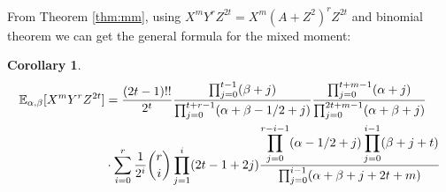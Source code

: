 \documentclass{elsarticle}
\def\E{\mathbb{E}}
\newtheorem{cor}{Corollary}
\begin{document}
From Theorem \ref{thm:mm},
using $X^m Y^r Z^{2t} = X^m(A+Z^2)^r Z^{2t} $ and
binomial theorem we can get
the general formula for the mixed moment:
\begin{cor}
\begin{align}
\E_{\alpha, \beta}[X^mY^rZ^{2t}] &= \frac{(2t-1)!!}{2^t}
\frac{\prod_{j=0}^{t-1} (\beta+j)}{\prod_{j=0}^{t+r-1} (\alpha+\beta-1/2+j)}
\frac{\prod_{j=0}^{t+m-1}(\alpha+j)}{\prod_{j=0}^{2t+m-1} (\alpha+\beta+j)}\notag\\
&\cdot\sum_{i=0}^r \frac{1}{2^i}\binom{r}{i}\prod_{j=1}^i (2t-1+2j)
\frac{\displaystyle\prod_{j=0}^{r-i-1}(\alpha-1/2+j)
\prod_{j=0}^{i-1}(\beta+j+t)}{\prod_{j=0}^{i-1}(\alpha+\beta+j+2t+m)}
\end{align}
\end{cor}


\end{document}
